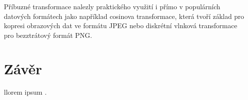 \documentclass[11pt,a4paper]{article}
\begin{document}
Příbuzné transformace nalezly praktického využití i přímo v populárních datových formátech jako například
cosinova transformace, která tvoří základ pro kopresi obrazových dat ve formátu JPEG nebo diskrétní vlnková 
transformace pro bezztrátový formát PNG.

\section{Závěr}
llorem ipsum \cite{pt}.




\end{document}
